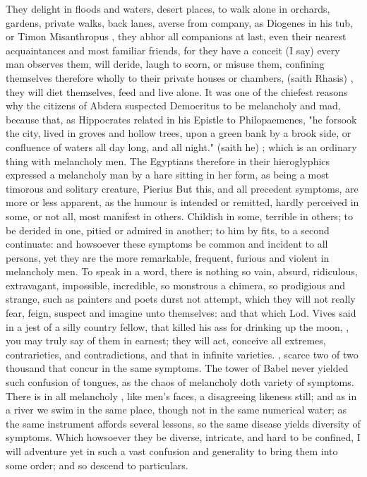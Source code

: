 {They delight in floods and waters, desert places, to walk alone in orchards,
gardens, private walks, back lanes, averse from company, as Diogenes in his
tub, or Timon Misanthropus , they abhor all companions at
last, even their nearest acquaintances and most familiar friends, for they have
a conceit (I say) every man observes them, will deride, laugh to scorn, or
misuse them, confining themselves therefore wholly to their private houses or
chambers,  (saith Rhasis) ,
 they will diet themselves, feed and
live alone. It was one of the chiefest reasons why the citizens of Abdera
suspected Democritus to be melancholy and mad, because that, as Hippocrates
related in his Epistle to Philopaemenes, "he forsook the
city, lived in groves and hollow trees, upon a green bank by a brook side, or
confluence of waters all day long, and all night."  (saith he)
; which is an ordinary
thing with melancholy men. The Egyptians therefore in their hieroglyphics
expressed a melancholy man by a hare sitting in her form, as being a most
timorous and solitary creature, Pierius  But this, and all precedent symptoms, are more or less apparent, as the
humour is intended or remitted, hardly perceived in some, or not all, most
manifest in others. Childish in some, terrible in others; to be derided in one,
pitied or admired in another; to him by fits, to a second continuate: and
howsoever these symptoms be common and incident to all persons, yet they are
the more remarkable, frequent, furious and violent in melancholy men. To speak
in a word, there is nothing so vain, absurd, ridiculous, extravagant,
impossible, incredible, so monstrous a chimera, so prodigious and strange,
such as painters and poets durst not attempt, which they
will not really fear, feign, suspect and imagine unto themselves: and that
which Lod. Vives said in a jest of a silly country fellow,
that killed his ass for drinking up the moon, , you
may truly say of them in earnest; they will act, conceive all extremes,
contrarieties, and contradictions, and that in infinite varieties.
, scarce two of
two thousand that concur in the same symptoms. The tower of Babel never yielded
such confusion of tongues, as the chaos of melancholy doth variety of symptoms.
There is in all melancholy , like men's faces, a
disagreeing likeness still; and as in a river we swim in the same place, though
not in the same numerical water; as the same instrument affords several
lessons, so the same disease yields diversity of symptoms. Which howsoever they
be diverse, intricate, and hard to be confined, I will adventure yet in such a
vast confusion and generality to bring them into some order; and so descend to
particulars.

}
